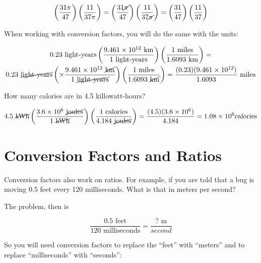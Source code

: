 $$\left( \frac{31\pi}{47} \right) \left( \frac{11}{37\pi}\right) = \left(\frac{31\cancel{\pi}}{47}\right) \left( \frac{11}{37\cancel{\pi}}\right) = \left(\frac{31}{47} \right) \left( \frac{11}{37} \right)$$

When working with conversion factors, you will do the same with the units:

\begin{multline*}
  0.23 \text{ light-years} \left( \frac{9.461 \times 10^{12} \text{ km}}{1 \text{ light-years}} \right) \left( \frac{1 \text{ miles}}{1.6093 \text{ km}} \right) = \\
  0.23 \text{ \cancel{light-years}} \left( \times \frac{9.461 \times 10^{12} \text{ \cancel{km}}}{1 \text{ \cancel{light-years}}} \right) \left( \frac{1 \text{ miles}}{1.6093 \text{ \cancel{km}}}\right) = \frac{(0.23)(9.461 \times 10^{12})}{1.6093} \text{ miles}$$
\end{multline*}

\begin{Exercise}[title={Simple Conversion Factors}, label=simple_conversion_factors]

  How many calories are in 4.5 killowatt-hours?
  
\end{Exercise}
\begin{Answer}[ref=simple_conversion_factors]

  $$4.5 \text{ \cancel{kWh}} \left( \frac{3.6 \times 10^{6} \text{ \cancel{joules}}}{1 \text{ \cancel{kWh}}} \right) \left( \frac{1 \text{ calories}}{4.184 \text{ \cancel{joules}}}\right) = \frac{(4.5)(3.6 \times 10^6)}{4.184} = 1.08 \times 10^6 \text {calories}$$
  
\end{Answer}

\section{Conversion Factors and Ratios}

Conversion factors also work on ratios.  For example, if you are told
that a bug is moving 0.5 feet every 120 milliseconds. What is that in
meters per second?

The problem, then is

$$\frac{0.5 \text{ feet}}{120 \text{ milliseconds}} = \frac{\text{? m}}{second}$$

So you will need conversion factors to replace the ``feet'' with ``meters'' and to replace ``milliseconds'' with ``seconds'':

